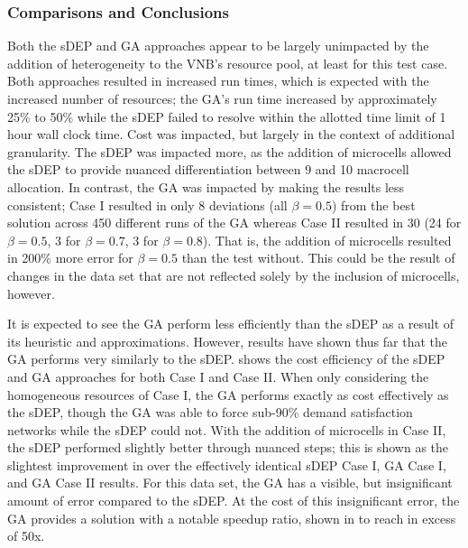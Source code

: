 \documentclass[12pt,dvipsnames]{report}
\begin{document}
\subsubsection{Comparisons and Conclusions}

Both the sDEP and GA approaches appear to be largely unimpacted by the addition of heterogeneity to the VNB's resource pool, at least for this test case.  Both approaches resulted in increased run times, which is expected with the increased number of resources; the GA's run time increased by approximately 25\% to 50\% while the sDEP failed to resolve within the allotted time limit of 1 hour wall clock time.  Cost was impacted, but largely in the context of additional granularity.  The sDEP was impacted more, as the addition of microcells allowed the sDEP to provide nuanced differentiation between 9 and 10 macrocell allocation.  In contrast, the GA was impacted by making the results less consistent; Case I resulted in only 8 deviations (all $\beta = 0.5$) from the best solution across 450 different runs of the GA whereas Case II resulted in 30 (24 for $\beta = 0.5$, 3 for $\beta = 0.7$, 3 for $\beta = 0.8$).  That is, the addition of microcells resulted in 200\% more error for $\beta = 0.5$ than the test without.  This could be the result of changes in the data set that are not reflected solely by the inclusion of microcells, however.

It is expected to see the GA perform less efficiently than the sDEP as a result of its heuristic and approximations.  However, results have shown thus far that the GA performs very similarly to the sDEP.   shows the cost efficiency of the sDEP and GA approaches for both Case I and Case II.  When only considering the homogeneous resources of Case I, the GA performs exactly as cost effectively as the sDEP, though the GA was able to force sub-90\% demand satisfaction networks while the sDEP could not.  With the addition of microcells in Case II, the sDEP performed slightly better through nuanced steps; this is shown as the slightest improvement in  over the effectively identical sDEP Case I, GA Case I, and GA Case II results.  For this data set, the GA has a visible, but insignificant amount of error compared to the sDEP.  At the cost of this insignificant error, the GA provides a solution with a notable speedup ratio, shown in  to reach in excess of 50x.
\end{document}
